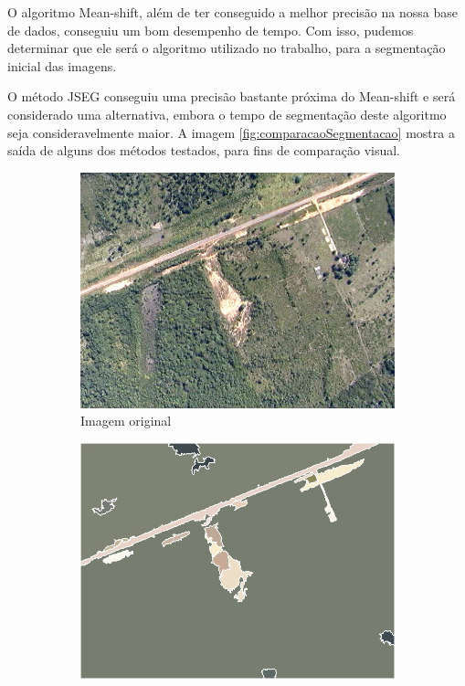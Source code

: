 O algoritmo Mean-shift, além de ter conseguido a melhor precisão na nossa base de dados, conseguiu um bom desempenho de tempo. Com isso, pudemos determinar que ele será o algoritmo utilizado no trabalho, para a segmentação inicial das imagens.

O método JSEG conseguiu uma precisão bastante próxima do Mean-shift e será considerado uma alternativa, embora o tempo de segmentação deste algoritmo seja consideravelmente maior. A imagem \ref{fig:comparacaoSegmentacao} mostra a saída de alguns dos métodos testados, para fins de comparação visual.

\begin{figure}[htb]
	\centering
	\begin{minipage}[l]{0.51\linewidth}
		\begin{subfigure}[b]{\linewidth}
			\includegraphics[width=\linewidth]{imgs/seg_original}
			\caption{Imagem original}
		\end{subfigure}%
	\end{minipage}
	\begin{minipage}[r]{0.48\linewidth}
		\begin{subfigure}{.47\linewidth}
			\includegraphics[width=\linewidth]{imgs/seg_meanshift}

\end{subfigure}
\end{minipage}
\end{figure}
